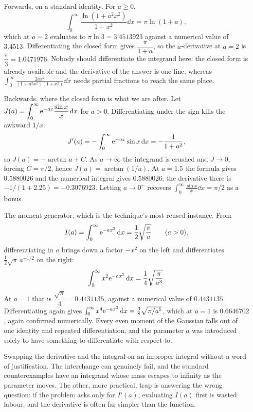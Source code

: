 \begin{worked}
Forwards, on a standard identity. For $a\geq0$,
\[
\int_{0}^{\infty}\frac{\ln(1+a^{2}x^{2})}{1+x^{2}}\dd x=\pi\ln(1+a),
\]
which at $a=2$ evaluates to $\pi\ln3=3.4513923$ against a numerical value of $3.4513$. Differentiating the closed form gives $\dfrac{\pi}{1+a}$, so the $a$-derivative at $a=2$ is $\dfrac{\pi}{3}=1.0471976$. Nobody should differentiate the integrand here: the closed form is already available and the derivative of the answer is one line, whereas $\int_{0}^{\infty}\frac{2ax^{2}}{(1+a^{2}x^{2})(1+x^{2})}\dd x$ needs partial fractions to reach the same place.

Backwards, where the closed form is what we are after. Let $J(a)=\displaystyle\int_{0}^{\infty}\mathrm{e}^{-ax}\frac{\sin x}{x}\,\mathrm{d} x$ for $a>0$. Differentiating under the sign kills the awkward $1/x$:
\[
J'(a)=-\int_{0}^{\infty}\mathrm{e}^{-ax}\sin x\,\mathrm{d} x=-\frac{1}{1+a^{2}} ,
\]
so $J(a)=-\arctan a+C$. As $a\to\infty$ the integrand is crushed and $J\to0$, forcing $C=\pi/2$, hence $J(a)=\arctan(1/a)$. At $a=1.5$ the formula gives $0.5880026$ and the numerical integral gives $0.5880026$; the derivative there is $-1/(1+2.25)=-0.3076923$. Letting $a\to0^{+}$ recovers $\int_{0}^{\infty}\frac{\sin x}{x}\dd x=\pi/2$ as a bonus.

The moment generator, which is the technique's most reused instance. From
\[
I(a)=\int_{0}^{\infty}\mathrm{e}^{-ax^{2}}\,\mathrm{d} x=\frac12\sqrt{\frac\pi a}\qquad(a>0),
\]
differentiating in $a$ brings down a factor $-x^{2}$ on the left and differentiates $\tfrac12\sqrt\pi\,a^{-1/2}$ on the right:
\[
\int_{0}^{\infty}x^{2}\mathrm{e}^{-ax^{2}}\,\mathrm{d} x=\frac14\sqrt{\frac{\pi}{a^{3}}} .
\]
At $a=1$ that is $\dfrac{\sqrt\pi}{4}=0.4431135$, against a numerical value of $0.4431135$. Differentiating again gives $\int_{0}^{\infty}x^{4}\mathrm{e}^{-ax^{2}}\,\mathrm{d} x=\tfrac38\sqrt{\pi/a^{5}}$, which at $a=1$ is $0.6646702$, again confirmed numerically. Every even moment of the Gaussian falls out of one identity and repeated differentiation, and the parameter $a$ was introduced solely to have something to differentiate with respect to.
\end{worked}

\begin{trap}
Swapping the derivative and the integral on an improper integral without a word of justification. The interchange can genuinely fail, and the standard counterexamples have an integrand whose mass escapes to infinity as the parameter moves. The other, more practical, trap is answering the wrong question: if the problem asks only for $I'(a)$, evaluating $I(a)$ first is wasted labour, and the derivative is often far simpler than the function.
\end{trap}

